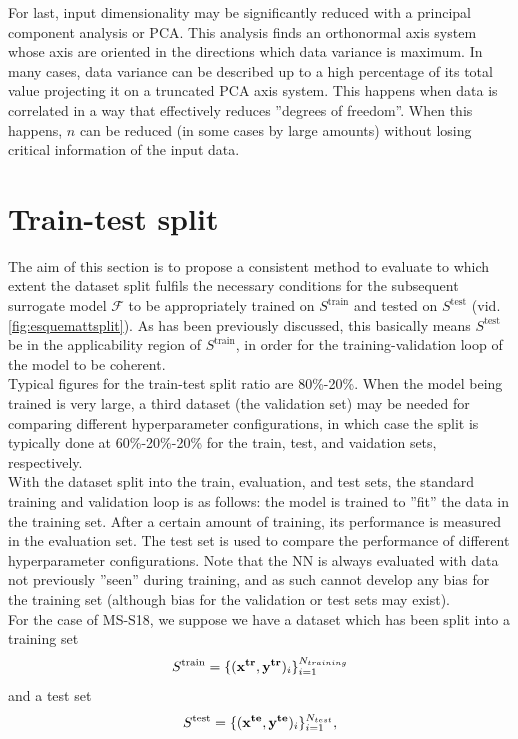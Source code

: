 For last, input dimensionality may be significantly reduced with a principal component analysis or PCA\cite{hotelling1933analysis}. This analysis finds an orthonormal axis system whose axis are oriented in the directions which data variance is maximum. In many cases, data variance can be described up to a high percentage of its total value projecting it on a truncated PCA axis system. This happens when data is correlated in a way that effectively reduces ''degrees of freedom''. When this happens, $n$ can be reduced (in some cases by large amounts) without losing critical information of the input data. 
\clearpage
\section{Train-test split}\label{sec:ttsplit}
The aim of this section is to propose a consistent method to evaluate to which extent the dataset split fulfils the necessary conditions for the subsequent surrogate model $\mathcal{F}$ to be appropriately trained on ${S}^{\text{train}}$ and tested on ${S}^{\text{test}}$ (vid. \autoref{fig:esquemattsplit}). As has been previously discussed, this basically means ${S}^{\text{test}}$ be in the applicability region of ${S}^{\text{train}}$, in order for the training-validation loop of the model to be coherent.\\
%
\indent Typical figures for the train-test split ratio are 80\%-20\%. When the model being trained is very large, a third dataset (the validation set) may be needed for comparing different hyperparameter configurations, in which case the split is typically done at 60\%-20\%-20\% for the train, test, and vaidation sets, respectively\cite[pp. 20-21]{Marsland2015Machine}.\\
%
\indent With the dataset split into the train, evaluation, and test sets, the standard training and validation loop is as follows: the model is trained to ''fit'' the data in the training set. After a certain amount of training, its performance is measured in the evaluation set. The test set is used to compare the performance of different hyperparameter configurations. Note that the NN is always evaluated with data not previously ''seen'' during training, and as such cannot develop any bias for the training set (although bias for the validation or test sets may exist).\\
%
\indent For the case of MS-S18, we suppose we have a dataset which has been split into a training set
$${S}^{\text{train}}=\{({\bf x^{tr}},{\bf y^{tr}})_i\}_{i=1}^{N_{training}}$$
and a test set
$${S}^{\text{test}}=\{({\bf x^{te}},{\bf y^{te}})_i\}_{i=1}^{N_{test}},$$
%

